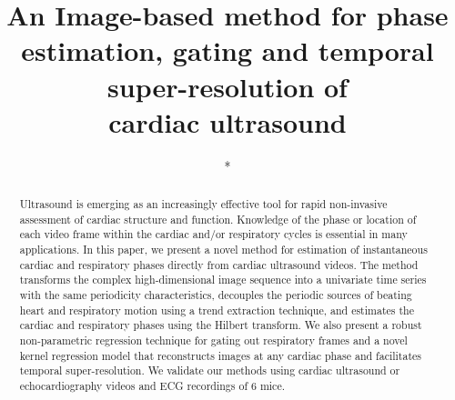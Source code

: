 \documentclass[runningheads,a4paper]{llncs}
\begin{document}
\mainmatter  %

\title{An Image-based method for phase estimation, gating and temporal super-resolution of \\cardiac ultrasound}


%
%

\author{*}
\authorrunning{*}   
\tocauthor{*}
\institute{*}

\maketitle

\begin{abstract}
Ultrasound is emerging as an increasingly effective tool for rapid non-invasive assessment of cardiac structure and function. Knowledge of the phase or location of each video frame within the cardiac and/or respiratory cycles is essential in many applications. In this paper, we present a novel method for estimation of instantaneous cardiac and respiratory phases directly from cardiac ultrasound videos. The method transforms the complex high-dimensional image sequence into a univariate time series with the same periodicity characteristics, decouples the periodic sources of beating heart and respiratory motion using a trend extraction technique, and estimates the cardiac and respiratory phases using the Hilbert transform. We also present a robust non-parametric regression technique for gating out respiratory frames and a novel kernel regression model that reconstructs images at any cardiac phase and facilitates temporal super-resolution. We validate our methods using cardiac ultrasound or echocardiography videos and ECG recordings of 6 mice.
\vspace{-0.5cm}
\end{abstract}
%
\end{document}
